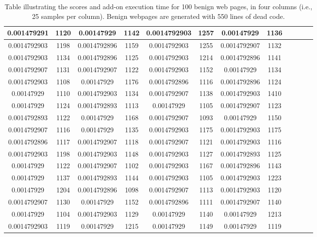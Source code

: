 \begin {table}[h]
\begin{tabular}{|c|c|c|c|c|c|c|c|c|c|c|c|}
\midrule
0.001479291&1120&0.00147929&1142&0.0014792903&1257&0.00147929&1136\\
\midrule
0.0014792903&1198&0.0014792896&1159&0.0014792903&1255&0.0014792907&1132\\
\midrule
0.0014792903&1134&0.0014792896&1125&0.0014792903&1214&0.0014792896&1141\\
\midrule
0.0014792907&1131&0.0014792907&1122&0.0014792903&1152&0.00147929&1134\\
\midrule
0.0014792903&1108&0.00147929&1176&0.0014792896&1116&0.0014792896&1124\\
\midrule
0.00147929&1110&0.0014792903&1134&0.0014792907&1138&0.0014792903&1410\\
\midrule
0.00147929&1124&0.0014792893&1113&0.00147929&1105&0.0014792907&1123\\
\midrule
0.0014792893&1122&0.00147929&1168&0.0014792907&1093&0.00147929&1150\\
\midrule
0.0014792907&1116&0.00147929&1135&0.0014792903&1175&0.0014792903&1175\\
\midrule
0.0014792896&1117&0.0014792907&1118&0.0014792907&1121&0.0014792903&1116\\
\midrule
0.0014792903&1198&0.0014792903&1148&0.0014792903&1127&0.0014792893&1125\\
\midrule
0.00147929&1122&0.0014792907&1102&0.0014792903&1167&0.0014792896&1143\\
\midrule
0.00147929&1137&0.0014792893&1144&0.0014792903&1105&0.0014792903&1223\\
\midrule
0.00147929&1204&0.0014792896&1098&0.0014792907&1113&0.0014792903&1120\\
\midrule
0.0014792907&1130&0.00147929&1152&0.0014792896&1111&0.0014792907&1140\\
\midrule
0.00147929&1104&0.0014792903&1129&0.00147929&1140&0.00147929&1213\\
\midrule
0.0014792903&1119&0.00147929&1215&0.00147929&1149&0.00147929&1119\\
\midrule
\end{tabular}
  \caption[Scores table of benign web pages]{Table illustrating the scores and add-on execution time for 100 benign web pages, in four columns (i.e., 25 samples per column). Benign webpages are generated with 550 lines of dead code.}\label{tab:b500table}
 \end {table}

